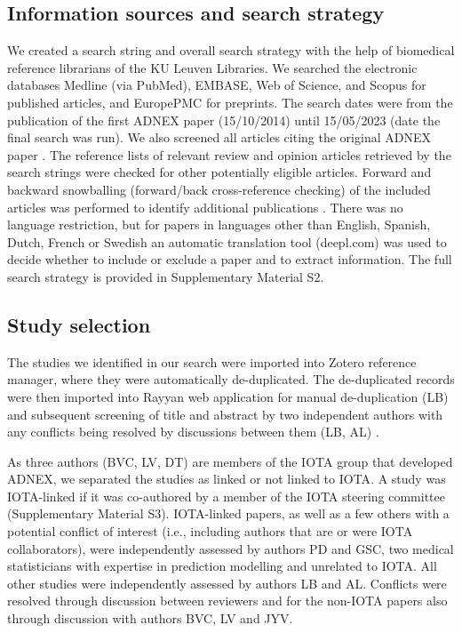 \subsection{Information sources and search strategy}
We created a search string and overall search strategy with the help of
biomedical reference librarians of the KU Leuven Libraries. We searched the
electronic databases Medline (via PubMed), EMBASE, Web of Science, and Scopus
for published articles, and EuropePMC for preprints. The search dates were from
the publication of the first \gls{ADNEX} paper (15/10/2014) until 15/05/2023 (date the
final search was run). We also screened all articles citing the original \gls{ADNEX}
paper \cite{vancalsterEvaluatingRiskOvarian2014}. The reference lists of
relevant review and opinion articles retrieved by the search strings were
checked for other potentially eligible articles. Forward and backward
snowballing (forward/back cross-reference checking) of the included articles was
performed to identify additional publications
 \cite{wohlinGuidelinesSnowballingSystematic2014}. There was no language
restriction, but for papers in languages other than English, Spanish, Dutch,
French or Swedish an automatic translation tool (deepl.com) was used to decide
whether to include or exclude a paper and to extract information. The full
search strategy is provided in Supplementary Material S2.

\subsection{Study selection}
The studies we identified in our search were imported into Zotero reference
manager, where they were automatically de-duplicated. The de-duplicated records
were then imported into Rayyan web application for manual de-duplication (LB)
and subsequent screening of title and abstract by two independent authors with
any conflicts being resolved by discussions between them (LB, AL)
 \cite{ouzzaniRayyanWebMobile2016}.

As three authors (BVC, LV, DT) are members of the \gls{IOTA} group that developed
\gls{ADNEX}, we separated the studies as linked or not linked to \gls{IOTA}. A study was
\gls{IOTA}-linked if it was co-authored by a member of the \gls{IOTA} steering committee
(Supplementary Material S3). \gls{IOTA}-linked papers, as well as a few others with a
potential conflict of interest (i.e., including authors that are or were \gls{IOTA}
collaborators), were independently assessed by authors PD and GSC, two medical
statisticians with expertise in prediction modelling and unrelated to \gls{IOTA}. All
other studies were independently assessed by authors LB and AL. Conflicts were
resolved through discussion between reviewers and for the non-\gls{IOTA} papers also
through discussion with authors BVC, LV and JYV.

